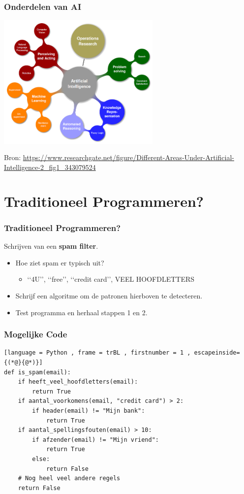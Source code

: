 \documentclass[aspectratio=169]{beamer}
\begin{document}
\begin{frame}
\frametitle{Onderdelen van AI}
\begin{center}
\includegraphics[width=0.6\textwidth]{graphics/areas-of-ai}
\end{center}
\tiny {Bron: \url{https://www.researchgate.net/figure/Different-Areas-Under-Artificial-Intelligence-2_fig1_343079524}}
\end{frame}

\section{Traditioneel Programmeren?}

\begin{frame}
\frametitle{Traditioneel Programmeren?}

Schrijven van een \textbf{spam filter}.

\begin{itemize}
\item Hoe ziet spam er typisch uit?
\pause
\begin{itemize}
	\item \lq\lq 4U\rq\rq, \lq\lq free\rq\rq, \lq\lq credit card\rq\rq, VEEL HOOFDLETTERS
\end{itemize}	
\item Schrijf een algoritme om de patronen hierboven te detecteren.
\item Test programma en herhaal stappen 1 en 2.
\end{itemize}

\end{frame}

\begin{frame}[fragile=singleslide]
\frametitle{Mogelijke Code}
\begin{lstlisting}[language = Python , frame = trBL , firstnumber = 1 , escapeinside={(*@}{@*)}]
def is_spam(email):
	if heeft_veel_hoofdletters(email):
		return True
	if aantal_voorkomens(email, "credit card") > 2:
		if header(email) != "Mijn bank":
			return True
	if aantal_spellingsfouten(email) > 10:
		if afzender(email) != "Mijn vriend":
			return True
		else:
			return False
	# Nog heel veel andere regels
	return False
\end{lstlisting}
\end{frame}
\end{document}
